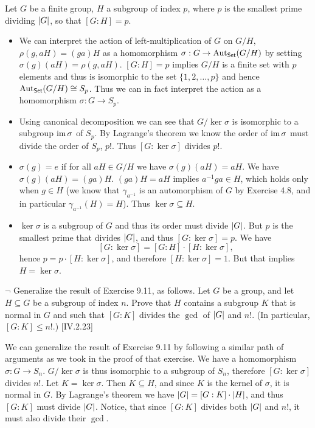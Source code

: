 \begin{solution}
	Let $G$ be a finite group, $H$ a subgroup of index $p$, where $p$ is the smallest prime dividing $\left|G\right|$, so that $[G:H] = p$.
	\begin{itemize}
		\item We can interpret the action of left-multiplication of $G$ on $G/H$, $\rho(g, aH) = (ga)H$ as a homomorphism $\sigma: G \to \mathrm{Aut}_{\mathsf{Set}}(G/H)$ by setting $\sigma(g)(aH) = \rho(g, aH)$. $[G:H] = p$ implies $G/H$ is a finite set with $p$ elements and thus is isomorphic to the set $\{ 1, 2, \dots, p \}$ and hence $\mathrm{Aut}_{\mathsf{Set}}(G/H) \cong S_p$. Thus we can in fact interpret the action as a homomorphism $\sigma: G \to S_p$.
		
		\item Using canonical decomposition we can see that $G/ \ker \sigma$ is isomorphic to a subgroup $\operatorname{im} \sigma$ of $S_p$. By Lagrange's theorem we know the order of $\operatorname{im} \sigma$ must divide the order of $S_p$, $p!$. Thus $[G:\ker \sigma]$ divides $p!$.
		
		\item $\sigma(g) = e$ if for all $aH \in G/H$ we have $\sigma(g)(aH) = aH$. We have $\sigma(g)(aH) = (ga)H$. $(ga)H = aH$ implies $a^{-1}ga \in H$, which holds only when $g \in H$ (we know that $\gamma_{a^{-1}}$ is an automorphism of $G$ by Exercise 4.8, and in particular $\gamma_{a^{-1}}(H) = H$). Thus $\ker \sigma \subseteq H$.
		
		\item $\ker \sigma$ is a subgroup of $G$ and thus its order must divide $\left|G\right|$. But $p$ is the smallest prime that divides $\left|G\right|$, and thus $[G:\ker \sigma] = p$. We have
		\[
			[G:\ker \sigma] = [G:H] \cdot [H:\ker \sigma] \text{,}
		\]
		hence $p = p \cdot [H:\ker \sigma]$, and therefore $[H:\ker \sigma] = 1$. But that implies $H = \ker \sigma$. \qedhere
	\end{itemize}
\end{solution}

\begin{problem}
	$\neg$ Generalize the result of Exercise 9.11, as follows. Let $G$ be a group, and let $H \subseteq G$ be a subgroup of index $n$. Prove that $H$ contains a subgroup $K$ that is normal in $G$ and such that $[G:K]$ divides the $\gcd$ of $\left|G\right|$ and $n!$. (In particular, $[G:K] \leq n!$.) [IV.2.23]
\end{problem}

\begin{solution}
	We can generalize the result of Exercise 9.11 by following a similar path of arguments as we took in the proof of that exercise. We have a homomorphism $\sigma: G \to S_n$. $G/\ker \sigma$ is thus isomorphic to a subgroup of $S_n$, therefore $[G:\ker \sigma]$ divides $n!$. Let $K = \ker \sigma$. Then $K \subseteq H$, and since $K$ is the kernel of $\sigma$, it is normal in $G$. By Lagrange's theorem we have $\left|G\right| = [G:K] \cdot \left|H\right|$, and thus $[G:K]$ must divide $\left|G\right|$. Notice, that since $[G:K]$ divides both $\left|G\right|$ and $n!$, it must also divide their $\gcd$.
\end{solution}

